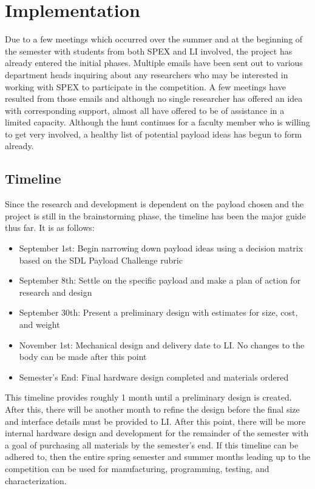 \documentclass[conference]{IEEEtran} %
\begin{document}
\section{Implementation}
\label{sec:implementation}
Due to a few meetings which occurred over the summer and at the beginning of the semester with students from both SPEX and LI
involved, the project has already entered the initial phases. Multiple emails have been sent out to various department heads
inquiring about any researchers who may be interested in working with SPEX to participate in the competition. A few meetings
have resulted from those emails and although no single researcher has offered an idea with corresponding support, almost
all have offered to be of assistance in a limited capacity. Although the hunt continues for a faculty member who is willing
to get very involved, a healthy list of potential payload ideas has begun to form already.

\subsection{Timeline}
\label{subsec:milestones}
Since the research and development is dependent on the payload chosen and the project is still in the brainstorming phase,
the timeline has been the major guide thus far. It is as follows:
\begin{itemize}
  \item September 1st: Begin narrowing down payload ideas using a decision matrix based on the SDL Payload Challenge rubric
  \item September 8th: Settle on the specific payload and make a plan of action for research and design
  \item September 30th: Present a preliminary design with estimates for size, cost, and weight
  \item November 1st: Mechanical design and delivery date to LI. No changes to the body can be made after this point
  \item Semester's End: Final hardware design completed and materials ordered
\end{itemize}

This timeline provides roughly 1 month until a preliminary design is created. After this, there will be another month to refine
the design before the final size and interface details must be provided to LI. After this point, there will be more internal
hardware design and development for the remainder of the semester with a goal of purchasing all materials by the semester's end.
If this timeline can be adhered to, then the entire spring semester and summer months leading up to the competition can be
used for manufacturing, programming, testing, and characterization.
\end{document}

